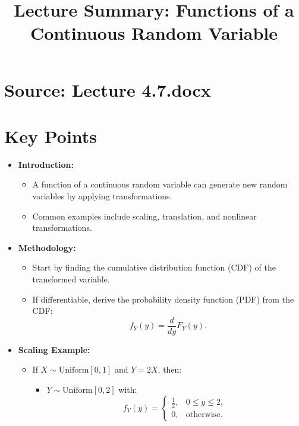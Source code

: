 \documentclass{article}
\title{Lecture Summary: Functions of a Continuous Random Variable}
\author{}
\date{}
\begin{document}
\maketitle

\section*{Source: Lecture 4.7.docx}

\section*{Key Points}

\begin{itemize}
  \item \textbf{Introduction:}
    \begin{itemize}
      \item A function of a continuous random variable can generate new random variables by applying transformations.
      \item Common examples include scaling, translation, and nonlinear transformations.
    \end{itemize}

  \item \textbf{Methodology:}
    \begin{itemize}
      \item Start by finding the cumulative distribution function (CDF) of the transformed variable.
      \item If differentiable, derive the probability density function (PDF) from the CDF:
        \[
          f_Y(y) = \frac{d}{dy}F_Y(y).
        \]
    \end{itemize}

  \item \textbf{Scaling Example:}
    \begin{itemize}
      \item If $X \sim \text{Uniform}[0, 1]$ and $Y = 2X$, then:
        \begin{itemize}
          \item $Y \sim \text{Uniform}[0, 2]$ with:
            \[
              f_Y(y) =
              \begin{cases}
                \frac{1}{2}, & 0 \leq y \leq 2, \\
                0, & \text{otherwise}.
              \end{cases}
            \]
        \end{itemize}
    \end{itemize}


\end{itemize}
\end{document}
